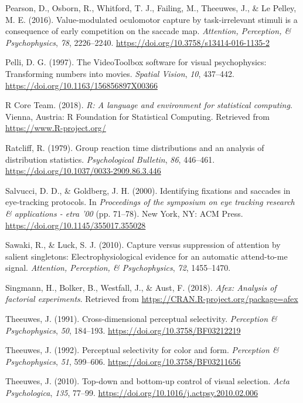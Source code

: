 \documentclass[man, a4paper, noextraspace, 11pt,floatsintext]{apa6}
\begin{document}
\hypertarget{ref-Pearson2016}{}
Pearson, D., Osborn, R., Whitford, T. J., Failing, M., Theeuwes, J., \&
Le Pelley, M. E. (2016). Value-modulated oculomotor capture by
task-irrelevant stimuli is a consequence of early competition on the
saccade map. \emph{Attention, Perception, \& Psychophysics}, \emph{78},
2226--2240. \url{https://doi.org/10.3758/s13414-016-1135-2}

\hypertarget{ref-Pelli1997}{}
Pelli, D. G. (1997). The VideoToolbox software for visual psychophysics:
Transforming numbers into movies. \emph{Spatial Vision}, \emph{10},
437--442. \url{https://doi.org/10.1163/156856897X00366}

\hypertarget{ref-R-base}{}
R Core Team. (2018). \emph{R: A language and environment for statistical
computing}. Vienna, Austria: R Foundation for Statistical Computing.
Retrieved from \url{https://www.R-project.org/}

\hypertarget{ref-Ratcliff1979}{}
Ratcliff, R. (1979). Group reaction time distributions and an analysis
of distribution statistics. \emph{Psychological Bulletin}, \emph{86},
446--461. \url{https://doi.org/10.1037/0033-2909.86.3.446}

\hypertarget{ref-Salvucci2000}{}
Salvucci, D. D., \& Goldberg, J. H. (2000). Identifying fixations and
saccades in eye-tracking protocols. In \emph{Proceedings of the
symposium on eye tracking research \& applications - etra '00} (pp.
71--78). New York, NY: ACM Press.
\url{https://doi.org/10.1145/355017.355028}

\hypertarget{ref-Sawaki2010}{}
Sawaki, R., \& Luck, S. J. (2010). Capture versus suppression of
attention by salient singletons: Electrophysiological evidence for an
automatic attend-to-me signal. \emph{Attention, Perception, \&
Psychophysics}, \emph{72}, 1455--1470.

\hypertarget{ref-R-afex}{}
Singmann, H., Bolker, B., Westfall, J., \& Aust, F. (2018). \emph{Afex:
Analysis of factorial experiments}. Retrieved from
\url{https://CRAN.R-project.org/package=afex}

\hypertarget{ref-Theeuwes1991a}{}
Theeuwes, J. (1991). Cross-dimensional perceptual selectivity.
\emph{Perception \& Psychophysics}, \emph{50}, 184--193.
\url{https://doi.org/10.3758/BF03212219}

\hypertarget{ref-Theeuwes1992}{}
Theeuwes, J. (1992). Perceptual selectivity for color and form.
\emph{Perception \& Psychophysics}, \emph{51}, 599--606.
\url{https://doi.org/10.3758/BF03211656}

\hypertarget{ref-Theeuwes2010}{}
Theeuwes, J. (2010). Top-down and bottom-up control of visual selection.
\emph{Acta Psychologica}, \emph{135}, 77--99.
\url{https://doi.org/10.1016/j.actpsy.2010.02.006}
\end{document}

